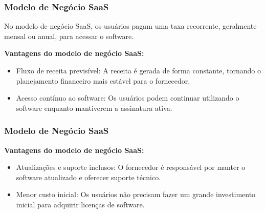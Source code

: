 \documentclass{beamer}
\begin{document}
\footlinecolor{}


\begin{frame}
	\frametitle{Modelo de Negócio SaaS}

	No modelo de negócio SaaS, os usuários pagam uma taxa recorrente, geralmente mensal ou anual, para acessar o software.

	\textbf{Vantagens do modelo de negócio SaaS:}

	\begin{itemize}
		\item Fluxo de receita previsível: A receita é gerada de forma constante, tornando o planejamento financeiro mais estável para o fornecedor.
		\item Acesso contínuo ao software: Os usuários podem continuar utilizando o software enquanto mantiverem a assinatura ativa.
	\end{itemize}
\end{frame}
\begin{frame}
	\frametitle{Modelo de Negócio SaaS}

	\textbf{Vantagens do modelo de negócio SaaS:}

	\begin{itemize}
		\item Atualizações e suporte inclusos: O fornecedor é responsável por manter o software atualizado e oferecer suporte técnico.
		\item Menor custo inicial: Os usuários não precisam fazer um grande investimento inicial para adquirir licenças de software.
	\end{itemize}


\end{frame}
\end{document}

